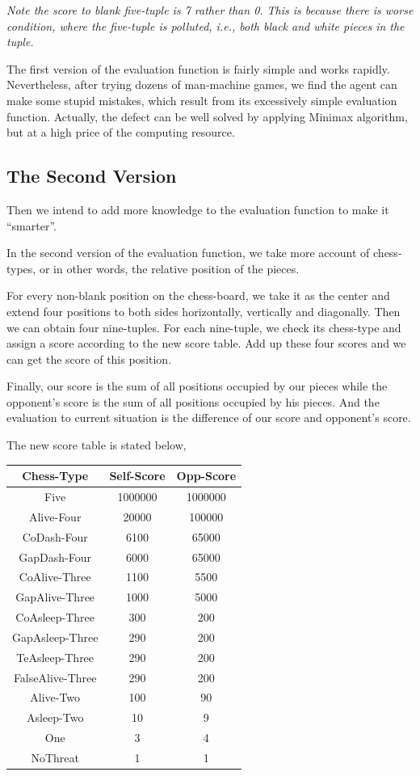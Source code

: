 \documentclass[12pt,a4paper]{article}
\begin{document}
\noindent\begin{small}\emph{Note the score to blank five-tuple is 7 rather than 0. This is because there is worse condition, where the five-tuple is polluted, i.e., both black and white pieces in the tuple.}\end{small}

The first version of the evaluation function is fairly simple and works rapidly. Nevertheless, after trying dozens of man-machine games, we find the agent can make some stupid mistakes, which result from its excessively simple evaluation function. Actually, the defect can be well solved by applying Minimax algorithm, but at a high price of the computing resource.
\subsection{The Second Version}
Then we intend to add more knowledge to the evaluation function to make it ``smarter''.

In the second version of the evaluation function, we take more account of chess-types, or in other words, the relative position of the pieces.

For every non-blank position on the chess-board, we take it as the center and extend four positions to both sides horizontally, vertically and diagonally. Then we can obtain four nine-tuples. For each nine-tuple, we check its chess-type and assign a score according to the new score table. Add up these four scores and we can get the score of this position.

Finally, our score is the sum of all positions occupied by our pieces while the opponent's score is the sum of all positions occupied by his pieces. And the evaluation to current situation is the difference of our score and opponent's score.

The new score table is stated below,
\begin{table}[h]
\centering
\begin{tabular}{c|c|c}
\hline
Chess-Type&Self-Score&Opp-Score  \\
\hline
Five&1000000&1000000\\
Alive-Four&20000&100000\\
CoDash-Four&6100&65000\\
GapDash-Four&6000&65000\\
CoAlive-Three&1100&5500\\
GapAlive-Three&1000&5000\\
CoAsleep-Three&300&200\\
GapAsleep-Three&290&200\\
TeAsleep-Three&290&200\\
FalseAlive-Three&290&200\\
Alive-Two&100&90\\
Asleep-Two&10&9\\
One&3&4\\
NoThreat&1&1\\
\hline
\end{tabular}
\end{table}
\end{document}
